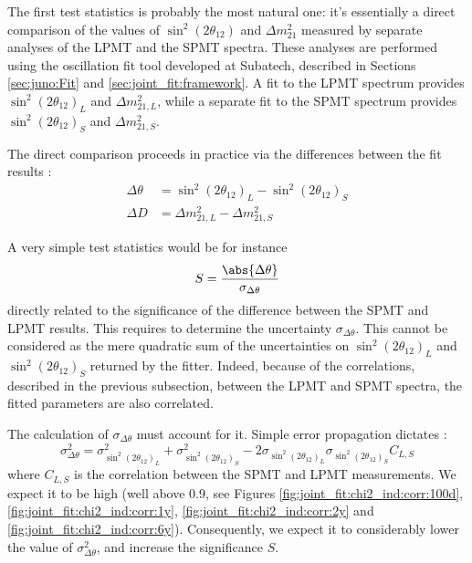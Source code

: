\documentclass[../main.tex]{subfiles}
\begin{document}
The first test statistics is probably the most natural one: it's essentially a direct comparison of the values of $\sin^2(2\theta_{12})$ and $\Delta m^2_{21}$ measured by separate analyses of the LPMT and the SPMT spectra. These analyses are performed using the oscillation fit tool developed at Subatech, described in Sections \ref{sec:juno:Fit} and \ref{sec:joint_fit:framework}.
A fit to the LPMT spectrum provides  $\sin^2(2\theta_{12})_L$ and $\Delta m^2_{21,L}$, while a separate fit to the SPMT spectrum provides $\sin^2(2\theta_{12})_S$ and $\Delta m^2_{21,S}$.

The direct comparison proceeds in practice via the differences between the fit results :
\begin{align}
  \Delta \theta &= \sin^2(2\theta_{12})_L  - \sin^2(2\theta_{12})_S \label{eq:joint_fit:delta_t} \\
  \Delta D   &= \Delta m^2_{21,L}  - \Delta m^2_{21,S} \label{eq:joint_fit:delta_d}
\end{align}

\hfill

A very simple test statistics would be for instance
\begin{equation}
  S = \frac{\abs{ \Delta \theta}}{ \sigma_{\Delta \theta} }
\end{equation}
directly related to the significance of the difference between the SPMT and LPMT results. This requires to determine the uncertainty $\sigma_{\Delta \theta}$. This cannot be considered as the mere quadratic sum of the uncertainties on $\sin^2(2\theta_{12})_L$ and $\sin^2(2\theta_{12})_S$ returned by the fitter. Indeed, because of the correlations, described in the previous subsection, between the LPMT and SPMT spectra, the fitted parameters are also correlated.

The calculation of $\sigma_{\Delta \theta}$ must account for it. Simple error propagation dictates :
\begin{equation}
\sigma^2_{\Delta \theta} = \sigma^2_{\sin^2(2\theta_{12})_L} + \sigma^2_{\sin^2(2\theta_{12})_S} - 2\sigma_{\sin^2(2\theta_{12})_L}\sigma_{\sin^2(2\theta_{12})_S}C_{L,S}
\end{equation}
where $C_{L,S}$ is the correlation  between the SPMT and LPMT measurements. We expect it to be high (well above 0.9, see Figures \ref{fig:joint_fit:chi2_ind:corr:100d}, \ref{fig:joint_fit:chi2_ind:corr:1y}, \ref{fig:joint_fit:chi2_ind:corr:2y} and \ref{fig:joint_fit:chi2_ind:corr:6y}). Consequently, we expect it to considerably lower the value of $\sigma^2_{\Delta \theta}$, and increase the significance $S$.
\hfill
\end{document}
